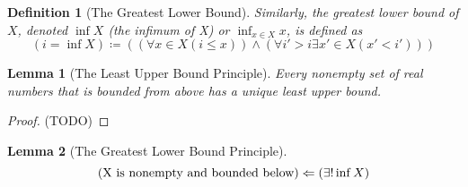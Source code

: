 \documentclass[onecolumn]{ctexart}
\newtheorem{definition}{Definition}
\newtheorem{lemma}{Lemma}
\begin{document}
\begin{definition}[The Greatest Lower Bound]
  Similarly, the greatest lower bound of $X$, denoted $\inf X$ (the infimum of X) 
  or $\inf_{x \in X} x$, is defined as
  \[
    (i = \inf X) \coloneqq ((\forall x \in X (i \leq x)) \wedge (\forall i' > i \exists x' \in X (x' < i')))
  \]
\end{definition}

\begin{lemma}[The Least Upper Bound Principle]
  Every nonempty set of real numbers that is bounded from above has a unique 
  least upper bound.
\end{lemma}
\begin{proof}
  (TODO)
\end{proof}

\begin{lemma}[The Greatest Lower Bound Principle]
  \[
    (\textnormal{X is nonempty and bounded below}) \Leftarrow (\exists! \inf X)
  \]
\end{lemma}
\end{document}

